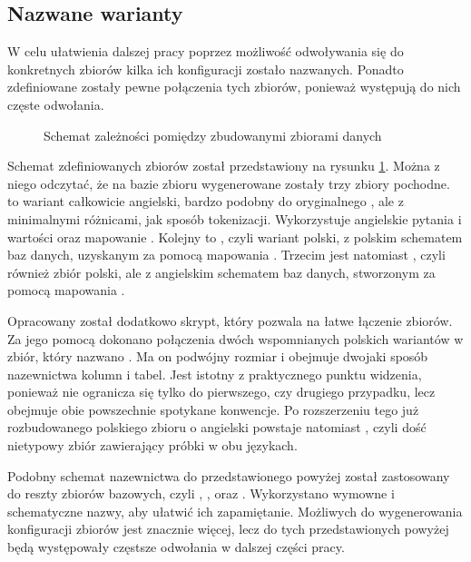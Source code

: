 \subsection{Nazwane warianty}

W celu ułatwienia dalszej pracy poprzez możliwość odwoływania się do konkretnych zbiorów kilka ich konfiguracji zostało nazwanych. Ponadto zdefiniowane zostały pewne połączenia tych zbiorów, ponieważ występują do nich częste odwołania.

\begin{figure}[ht!]
  \centering
  
  \caption{Schemat zależności pomiędzy zbudowanymi zbiorami danych}
  \label{fig:datasets}
\end{figure}

Schemat zdefiniowanych zbiorów został przedstawiony na rysunku \ref{fig:datasets}. Można z niego odczytać, że na bazie zbioru  wygenerowane zostały trzy zbiory pochodne.  to wariant całkowicie angielski, bardzo podobny do oryginalnego , ale z minimalnymi różnicami, jak sposób tokenizacji. Wykorzystuje angielskie pytania i wartości oraz mapowanie . Kolejny to , czyli wariant polski, z polskim schematem baz danych, uzyskanym za pomocą mapowania . Trzecim jest natomiast \mbox{}, czyli również zbiór polski, ale z angielskim schematem baz danych, stworzonym za pomocą mapowania .

Opracowany został dodatkowo skrypt, który pozwala na łatwe łączenie zbiorów. Za jego pomocą dokonano połączenia dwóch wspomnianych polskich wariantów w zbiór, który nazwano . Ma on podwójny rozmiar i obejmuje dwojaki sposób nazewnictwa kolumn i tabel. Jest istotny z praktycznego punktu widzenia, ponieważ nie ogranicza się tylko do pierwszego, czy drugiego przypadku, lecz obejmuje obie powszechnie spotykane konwencje. Po rozszerzeniu tego już rozbudowanego polskiego zbioru o angielski  powstaje natomiast , czyli dość nietypowy zbiór zawierający próbki w obu językach.

Podobny schemat nazewnictwa do przedstawionego powyżej został zastosowany do reszty zbiorów bazowych, czyli , ,  oraz . Wykorzystano wymowne i schematyczne nazwy, aby ułatwić ich zapamiętanie. Możliwych do wygenerowania konfiguracji zbiorów jest znacznie więcej, lecz do tych przedstawionych powyżej będą występowały częstsze odwołania w dalszej części pracy.
